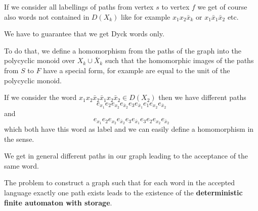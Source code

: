 If we consider all labellings of paths from vertex $s$ to vertex $f$ we get of
course also words not contained in $D(X_k)$ like for example $x_1 x_2
\bar{x}_k$ or $x_1 \bar{x}_1 \bar{x}_2$ etc.

We have to guarantee that we get Dyck words only. 

To do that, we define a homomorphism from the paths of the graph into the
polycyclic monoid over $X_k \cup \bar{X}_k$ such that the homomorphic images of the paths 
from $S$ to $F$ have a special form, for example are equal to the unit of the
polycyclic monoid.

If we consider the word $ x_1 x_2 \bar{x}_2 \bar{x}_1 x_2 \bar{x}_2 \in D(X_2)$
then we have different paths 
\[e_{x_1} e_2 e_{x_2} e_{\bar{x}_2} e_3 e_{\bar{x}_1} e_1 e_{x_2} e_{\bar{x}_2} \] 
and 
\[e_{x_1} e_2 e_{x_2} e_{\bar{x}_2} e_3 e_{\bar{x}_1} e_3 e_2 e_{x_2}
e_{\bar{x}_2}\] 
which both have this word as label and we can easily define a homomorphism in
the sense.

We get in general different paths in our graph leading to the acceptance of the
same word.

The problem to construct a graph such that for each word in the accepted
language exactly one path exists leads to the existence of the {\bf
deterministic finite automaton with storage}.

